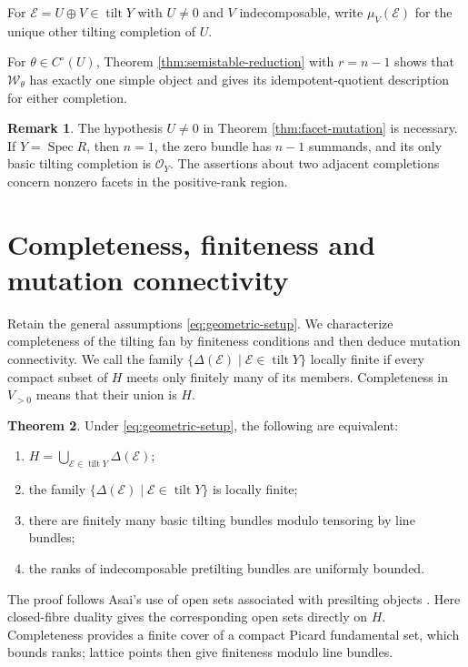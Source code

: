 \documentclass[a4paper,reqno]{amsart}
\def\E{\mathcal{E}}
\def\O{\mathcal{O}}
\def\W{\mathcal{W}}
\DeclareMathOperator{\Spec}{Spec}
\DeclareMathOperator{\tilt}{tilt}
\theoremstyle{definition}
\newtheorem{Thm}{Theorem}[section]
\newtheorem{Rem}[Thm]{Remark}
\begin{document}
For $\E=U\oplus V\in\tilt Y$ with $U\ne0$ and $V$ indecomposable, write $\mu_V(\E)$ for the unique other tilting completion of $U$.

For $\theta\in C^\circ(U)$, Theorem \ref{thm:semistable-reduction} with $r=n-1$ shows that $\W_\theta$ has exactly one simple object and gives its idempotent-quotient description for either completion.

\begin{Rem}
The hypothesis $U\ne0$ in Theorem \ref{thm:facet-mutation} is necessary. If $Y=\Spec R$, then $n=1$, the zero bundle has $n-1$ summands, and its only basic tilting completion is $\O_Y$. The assertions about two adjacent completions concern nonzero facets in the positive-rank region.
\end{Rem}

\section{Completeness, finiteness and mutation connectivity}\label{sec:completeness}

Retain the general assumptions \eqref{eq:geometric-setup}. We characterize completeness of the tilting fan by finiteness conditions and then deduce mutation connectivity. We call the family $\{\Delta(\E)\mid\E\in\tilt Y\}$ locally finite if every compact subset of $H$ meets only finitely many of its members. Completeness in $V_{>0}$ means that their union is $H$.

\begin{Thm}\label{thm:complete-finite}
Under \eqref{eq:geometric-setup}, the following are equivalent:
\begin{enumerate}
\item $H=\bigcup_{\E\in\tilt Y}\Delta(\E)$;
\item the family $\{\Delta(\E)\mid\E\in\tilt Y\}$ is locally finite;
\item there are finitely many basic tilting bundles modulo tensoring by line bundles;
\item the ranks of indecomposable pretilting bundles are uniformly bounded.
\end{enumerate}
\end{Thm}

The proof follows Asai's use of open sets associated with presilting objects \cite[Lemma 4.3 and proof of Proposition 4.9]{Asa21}. Here closed-fibre duality gives the corresponding open sets directly on $H$. Completeness provides a finite cover of a compact Picard fundamental set, which bounds ranks; lattice points then give finiteness modulo line bundles.
\end{document}
